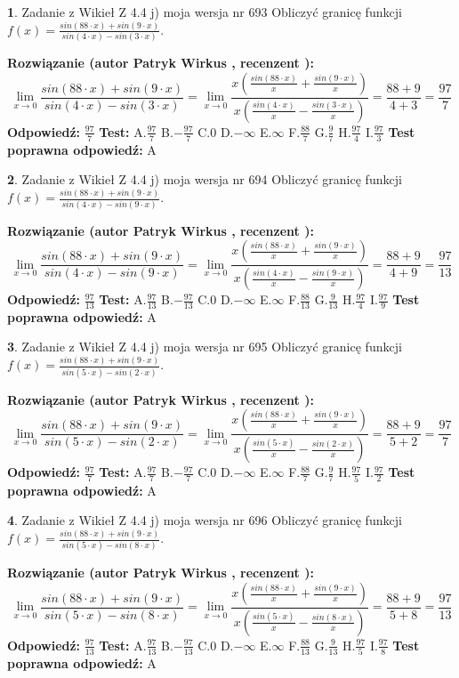 \documentclass[12pt, a4paper]{article}
\theoremstyle{definition} %
\newtheorem{zad}{}
\newcommand{\zadStart}[1]{\begin{zad}#1\newline}
\newcommand{\zadStop}{\end{zad}}
\newcommand{\rozwStart}[2]{\noindent \textbf{Rozwiązanie (autor #1 , recenzent #2): }\newline}
\newcommand{\rozwStop}{\newline}
\newcommand{\odpStart}{\noindent \textbf{Odpowiedź:}\newline}
\newcommand{\odpStop}{\newline}
\newcommand{\testStart}{\noindent \textbf{Test:}\newline}
\newcommand{\testStop}{\newline}
\newcommand{\kluczStart}{\noindent \textbf{Test poprawna odpowiedź:}\newline}
\newcommand{\kluczStop}{\newline}
\begin{document}
\zadStart{Zadanie z Wikieł Z 4.4 j) moja wersja nr 693}
Obliczyć granicę funkcji $f(x)=\frac{sin(88\cdot x) +sin(9\cdot x)}{sin(4\cdot x) -sin(3\cdot x)}$.
\zadStop
\rozwStart{Patryk Wirkus}{}
$$\lim\limits_{x\to 0}\frac{sin(88\cdot x) +sin(9\cdot x)}{sin(4\cdot x) -sin(3\cdot x)}=\lim\limits_{x\to 0}\frac{x(\frac{sin(88\cdot x)}{x}+\frac{sin(9\cdot x)}{x})}{x(\frac{sin(4\cdot x)}{x}-\frac{sin(3\cdot x)}{x})}=\frac{88+9}{4+3} = \frac{97}{7}$$
\rozwStop
\odpStart
$\frac{97}{7}$
\odpStop
\testStart
A.$\frac{97}{7}$
B.$-\frac{97}{7}$
C.$0$
D.$-\infty$
E.$\infty$
F.$\frac{88}{7}$
G.$\frac{9}{7}$
H.$\frac{97}{4}$
I.$\frac{97}{3}$
\testStop
\kluczStart
A
\kluczStop



\zadStart{Zadanie z Wikieł Z 4.4 j) moja wersja nr 694}
Obliczyć granicę funkcji $f(x)=\frac{sin(88\cdot x) +sin(9\cdot x)}{sin(4\cdot x) -sin(9\cdot x)}$.
\zadStop
\rozwStart{Patryk Wirkus}{}
$$\lim\limits_{x\to 0}\frac{sin(88\cdot x) +sin(9\cdot x)}{sin(4\cdot x) -sin(9\cdot x)}=\lim\limits_{x\to 0}\frac{x(\frac{sin(88\cdot x)}{x}+\frac{sin(9\cdot x)}{x})}{x(\frac{sin(4\cdot x)}{x}-\frac{sin(9\cdot x)}{x})}=\frac{88+9}{4+9} = \frac{97}{13}$$
\rozwStop
\odpStart
$\frac{97}{13}$
\odpStop
\testStart
A.$\frac{97}{13}$
B.$-\frac{97}{13}$
C.$0$
D.$-\infty$
E.$\infty$
F.$\frac{88}{13}$
G.$\frac{9}{13}$
H.$\frac{97}{4}$
I.$\frac{97}{9}$
\testStop
\kluczStart
A
\kluczStop



\zadStart{Zadanie z Wikieł Z 4.4 j) moja wersja nr 695}
Obliczyć granicę funkcji $f(x)=\frac{sin(88\cdot x) +sin(9\cdot x)}{sin(5\cdot x) -sin(2\cdot x)}$.
\zadStop
\rozwStart{Patryk Wirkus}{}
$$\lim\limits_{x\to 0}\frac{sin(88\cdot x) +sin(9\cdot x)}{sin(5\cdot x) -sin(2\cdot x)}=\lim\limits_{x\to 0}\frac{x(\frac{sin(88\cdot x)}{x}+\frac{sin(9\cdot x)}{x})}{x(\frac{sin(5\cdot x)}{x}-\frac{sin(2\cdot x)}{x})}=\frac{88+9}{5+2} = \frac{97}{7}$$
\rozwStop
\odpStart
$\frac{97}{7}$
\odpStop
\testStart
A.$\frac{97}{7}$
B.$-\frac{97}{7}$
C.$0$
D.$-\infty$
E.$\infty$
F.$\frac{88}{7}$
G.$\frac{9}{7}$
H.$\frac{97}{5}$
I.$\frac{97}{2}$
\testStop
\kluczStart
A
\kluczStop



\zadStart{Zadanie z Wikieł Z 4.4 j) moja wersja nr 696}
Obliczyć granicę funkcji $f(x)=\frac{sin(88\cdot x) +sin(9\cdot x)}{sin(5\cdot x) -sin(8\cdot x)}$.
\zadStop
\rozwStart{Patryk Wirkus}{}
$$\lim\limits_{x\to 0}\frac{sin(88\cdot x) +sin(9\cdot x)}{sin(5\cdot x) -sin(8\cdot x)}=\lim\limits_{x\to 0}\frac{x(\frac{sin(88\cdot x)}{x}+\frac{sin(9\cdot x)}{x})}{x(\frac{sin(5\cdot x)}{x}-\frac{sin(8\cdot x)}{x})}=\frac{88+9}{5+8} = \frac{97}{13}$$
\rozwStop
\odpStart
$\frac{97}{13}$
\odpStop
\testStart
A.$\frac{97}{13}$
B.$-\frac{97}{13}$
C.$0$
D.$-\infty$
E.$\infty$
F.$\frac{88}{13}$
G.$\frac{9}{13}$
H.$\frac{97}{5}$
I.$\frac{97}{8}$
\testStop
\kluczStart
A
\kluczStop
\end{document}
